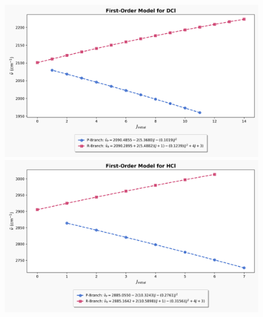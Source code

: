\documentclass[titlepage]{article}
\begin{document}
\begin{figure}[htbp]
    \begin{minipage}[t]{\textwidth}
        \centering
        \includegraphics[width=\linewidth]{example-analysis/dcl-first-order-fit.png}
    \end{minipage}
\caption*{\mbox{}}
\begin{minipage}[t]{\textwidth}
        \centering
        \includegraphics[width=\linewidth]{example-analysis/hcl-first-order-fit.png}
    \end{minipage}
\end{figure}
\end{document}
